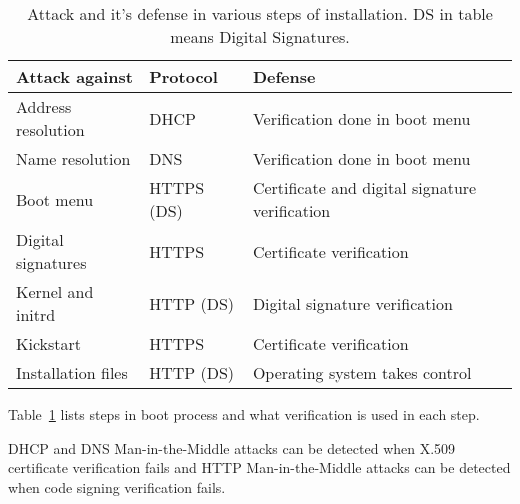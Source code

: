 \begin{table}[!ht]
  \def\arraystretch{1.1}%
  \begin{center}
    \begin{tabular}{| l | l | l |}
      \hline
      Attack against     & Protocol   & Defense                                        \\
      \hline
      Address resolution & DHCP       & Verification done in boot menu              \\
      Name resolution    & DNS        & Verification done in boot menu              \\
      Boot menu          & HTTPS (DS) & Certificate and digital signature verification \\
      Digital signatures & HTTPS      & Certificate verification                     \\
      Kernel and initrd  & HTTP (DS)  & Digital signature verification               \\
      Kickstart          & HTTPS      & Certificate verification                     \\
      Installation files & HTTP (DS)  & Operating system takes control               \\
      \hline
    \end{tabular}
    \caption{Attack and it's defense in various steps of
      installation. DS in table means Digital
      Signatures.\label{tab:attack_and_defence}}
  \end{center}
\end{table}

Table~\ref{tab:attack_and_defence} lists steps in boot process and
what verification is used in each step.

DHCP and DNS Man-in-the-Middle attacks can be detected when X.509
certificate verification fails and HTTP Man-in-the-Middle attacks can
be detected when code signing verification fails.


